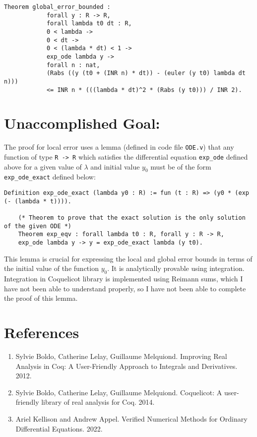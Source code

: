 \documentclass{article}
\begin{document}
\begin{itemize}
\begin{itemize}
        \begin{lstlisting}[language=Coq]
            Theorem global_error_bounded :
            forall y : R -> R,
            forall lambda t0 dt : R,
            0 < lambda -> 
            0 < dt ->  
            0 < (lambda * dt) < 1 -> 
            exp_ode lambda y ->
            forall n : nat,
            (Rabs ((y (t0 + (INR n) * dt)) - (euler (y t0) lambda dt n))) 
            <= INR n * (((lambda * dt)^2 * (Rabs (y t0))) / INR 2).
        \end{lstlisting}
    \end{itemize}
\end{itemize}

\newpage
\section*{Unaccomplished Goal:}
The proof for local error uses a lemma (defined in code file \texttt{ODE.v}) that any function of type \texttt{R -> R} which satisfies the differential equation \texttt{exp\_ode} defined above for a given value of $\lambda$ and initial value $y_0$ must be of the form \texttt{exp\_ode\_exact} defined below: 
\begin{lstlisting}[language=Coq]
    Definition exp_ode_exact (lambda y0 : R) := fun (t : R) => (y0 * (exp (- (lambda * t)))).

    (* Theorem to prove that the exact solution is the only solution of the given ODE *)
    Theorem exp_eqv : forall lambda t0 : R, forall y : R -> R,
    exp_ode lambda y -> y = exp_ode_exact lambda (y t0). 
\end{lstlisting}
This lemma is crucial for expressing the local and global error bounds in terms of the initial value of the function $y_0$. It is analytically provable using integration. Integration in Coquelicot library is implemented using Reimann sums, which I have not been able to understand properly, so I have not been able to complete the proof of this lemma. 

\section*{References}
\begin{enumerate}
    \item Sylvie Boldo, Catherine Lelay, Guillaume Melquiond. Improving Real Analysis in Coq: A User-Friendly Approach to Integrals and Derivatives. 2012.
    \item Sylvie Boldo, Catherine Lelay, Guillaume Melquiond. Coquelicot: A user-friendly library of real analysis for Coq. 2014.
    \item Ariel Kellison and Andrew Appel. Verified Numerical Methods for Ordinary Differential Equations. 2022.
\end{enumerate}
\end{document}
